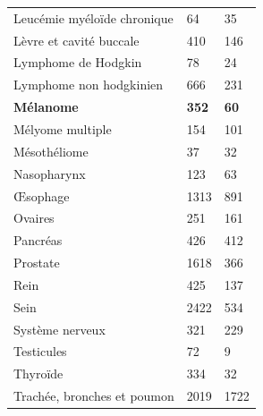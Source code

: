 \begin{table}[H]
\begin{tabular}{lll}
        Leucémie myéloïde chronique             & 64                            & 35                        \\
        Lèvre et cavité buccale                 & 410                           & 146                       \\
        Lymphome de Hodgkin                     & 78                            & 24                        \\
        Lymphome non hodgkinien                 & 666                           & 231                       \\
        \textbf{Mélanome}                       & \textbf{352}                  & \textbf{60}               \\
        Mélyome multiple                        & 154                           & 101                       \\
        Mésothéliome                            & 37                            & 32                        \\
        Nasopharynx                             & 123                           & 63                        \\
        Œsophage                                & 1313                          & 891                       \\
        Ovaires                                 & 251                           & 161                       \\
        Pancréas                                & 426                           & 412                       \\
        Prostate                                & 1618                          & 366                       \\
        Rein                                    & 425                           & 137                       \\
        Sein                                    & 2422                          & 534                       \\
        Système nerveux                         & 321                           & 229                       \\
        Testicules                              & 72                            & 9                         \\
        Thyroïde                                & 334                           & 32                        \\
        Trachée, bronches et poumon             & 2019                          & 1722                      \\

\end{tabular}
\end{table}
